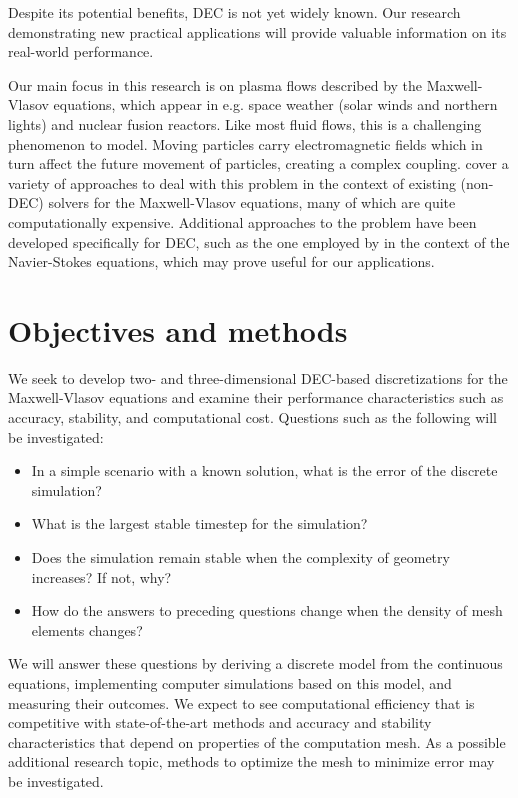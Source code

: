 \documentclass{article}
\begin{document}
Despite its potential benefits,
DEC is not yet widely known.
Our research demonstrating new practical applications
will provide valuable information on its real-world performance.

Our main focus in this research is on plasma flows described by the Maxwell-Vlasov equations,
which appear in e.g. space weather (solar winds and northern lights)
and nuclear fusion reactors.
Like most fluid flows, this is a challenging phenomenon to model.
Moving particles carry electromagnetic fields
which in turn affect the future movement of particles,
creating a complex coupling.
\textcite{palmroth_vlasov_2018} cover a variety of approaches to deal with this problem
in the context of existing (non-DEC) solvers for the Maxwell-Vlasov equations,
many of which are quite computationally expensive.
Additional approaches to the problem have been developed specifically for DEC,
such as the one employed by \textcite{mohamed_discrete_2016}
in the context of the Navier-Stokes equations,
which may prove useful for our applications.

\section*{Objectives and methods}

We seek to develop two- and three-dimensional DEC-based discretizations
for the Maxwell-Vlasov equations
and examine their performance characteristics such as accuracy,
stability, and computational cost.
Questions such as the following will be investigated:
\begin{itemize}
  \item In a simple scenario with a known solution,
  what is the error of the discrete simulation?
  \item What is the largest stable timestep for the simulation?
  \item Does the simulation remain stable when the complexity of geometry increases?
  If not, why?
  \item How do the answers to preceding questions change
  when the density of mesh elements changes?
\end{itemize}

We will answer these questions by deriving a discrete model from the continuous equations,
implementing computer simulations based on this model,
and measuring their outcomes.
We expect to see computational efficiency that is competitive with state-of-the-art methods
and accuracy and stability characteristics that depend on properties of the computation mesh.
As a possible additional research topic, methods to optimize the mesh
to minimize error may be investigated.
\end{document}
